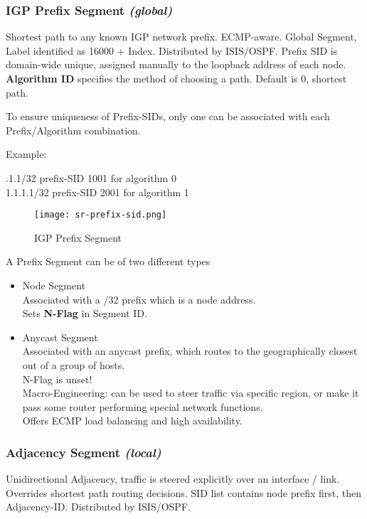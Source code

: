 \subsubsection{IGP Prefix Segment \emph{(global)}}
Shortest path to any known IGP network prefix. 
ECMP-aware. 
Global Segment, Label identified as 16000 + Index.
Distributed by ISIS/OSPF.
Prefix SID is domain-wide unique, assigned manually to the loopback address of each node.
\textbf{Algorithm ID} specifies the method of choosing a path. Default is 0, shortest path.

To ensure uniqueness of Prefix-SIDs, only one can be associated with each Prefix/Algorithm combination.

Example:

\noindent
{}.1.1/32 prefix-SID 1001 for algorithm 0 \\ 
1.1.1.1/32 prefix-SID 2001 for algorithm 1 \\
\rmfamily

\begin{figure}
    \centering
    \texttt{[image: sr-prefix-sid.png]}
    \caption{IGP Prefix Segment}
\end{figure}

\vspace{5mm}
\noindent
A Prefix Segment can be of two different types
\begin{itemize}
    \item Node Segment \\
    Associated with a /32 prefix which is a node address. \\
    Sets \textbf{N-Flag} in Segment ID.
    \item Anycast Segment \\
    Associated with an anycast prefix, which routes to the geographically closest out of a group of hosts. \\
    N-Flag is unset! \\ 
    Macro-Engineering: can be used to steer traffic via specific region, or make it pass some router performing special network functions. \\
    Offers ECMP load balancing and high availability.
\end{itemize}

\subsubsection{Adjacency Segment \emph{(local)}}
Unidirectional Adjacency, traffic is steered explicitly over an interface / link. 
Overrides shortest path routing decisions.
SID list contains node prefix first, then Adjacency-ID. 
Distributed by ISIS/OSPF.

